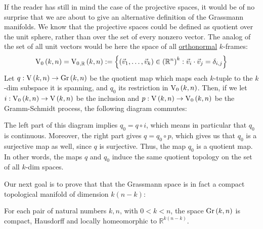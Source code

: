 If the reader has still in mind the case of the projective spaces, it would be of no surprise that we are about to give an alternative definition of the Grassmann manifolds. We know that the projective spaces could be defined as quotient over the unit sphere, rather than over the set of every nonzero vector. The analog of the set of all unit vectors would be here the space of all \ul{orthonormal} $k$-frames:
$$\StO{k}{n}=\StO{k}{n}{\mathbb{R}}:=\left\{\left(\vec{v}_1,\ldots,\vec{v}_k\right)\in\left(\mathbb{R}^n\right)^k:\vec{v}_i\cdot\vec{v}_j=\delta_{i,j}\right\}$$
Let $q:\St{k}{n}\to\Gr{k}{n}$ be the quotient map which maps each $k$-tuple to the $k$-dim subspace it is spanning, and $q_0$ its restriction in $\StO{k}{n}$. Then, if we let $i:\StO{k}{n}\to\St{k}{n}$ be the inclusion and $p:\St{k}{n}\to\StO{k}{n}$ be the Gramm-Schmidt process, the following diagram commutes:

\begin{center}
\end{center}

The left part of this diagram implies $q_0=q\circ i$, which means in particular that $q_0$ is continuous. Moreover, the right part gives $q=q_0\circ p$, which gives us that $q_0$ is a surjective map as well, since $q$ is surjective. Thus, the map $q_0$ is a quotient map. In other words, the maps $q$ and $q_0$ induce the same quotient topology on the set of all $k$-dim spaces.

Our next goal is to prove that that the Grassmann space is in fact a compact topological manifold of dimension $k(n-k)$:

\begin{lemma} For each pair of natural numbers $k,n$, with $0<k<n$, the space $\Gr{k}{n}$ is compact, Hausdorff and locally homeomorphic to $\mathbb{R}^{k(n-k)}$. 
\end{lemma}

